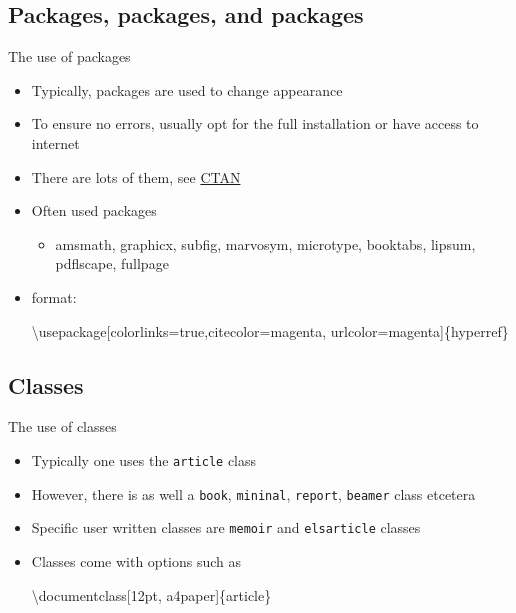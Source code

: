 \documentclass[ignorenonframetext,]{beamer}
\newenvironment{Shaded}{\begin{snugshade}}{\end{snugshade}}
\newcommand{\NormalTok}[1]{{#1}}
\begin{document}
\subsection{Packages, packages, and packages}
\begin{frame}[fragile]{The use of packages}

\begin{itemize}
\item
  Typically, packages are used to change appearance
\item
  To ensure no errors, usually opt for the full installation or have
  access to internet
\item
  There are lots of them, see \href{http://www.ctan.org}{CTAN}
\item
  Often used packages

  \begin{itemize}
  \itemsep1pt\parskip0pt
  \item
    amsmath, graphicx, subfig, marvosym, microtype, booktabs, lipsum,
    pdflscape, fullpage
  \end{itemize}
\item
  format:

\begin{Shaded}
\begin{Highlighting}[]
\NormalTok{\textbackslash{}usepackage[colorlinks=true,citecolor=magenta,}
        \NormalTok{urlcolor=magenta]\{hyperref\} }
\end{Highlighting}
\end{Shaded}
\end{itemize}

\end{frame}

\subsection{Classes}

\begin{frame}[fragile]{The use of classes}
\begin{itemize}
\item
  Typically one uses the \texttt{article} class
\item
  However, there is as well a \texttt{book}, \texttt{mininal},
  \texttt{report}, \texttt{beamer} class etcetera
\item
  Specific user written classes are \texttt{memoir} and
  \texttt{elsarticle} classes
\item
  Classes come with options such as

\begin{Shaded}
\begin{Highlighting}[]
\NormalTok{\textbackslash{}documentclass[12pt, a4paper]\{article\}}
\end{Highlighting}
\end{Shaded}
\end{itemize}

\end{frame}
\end{document}
